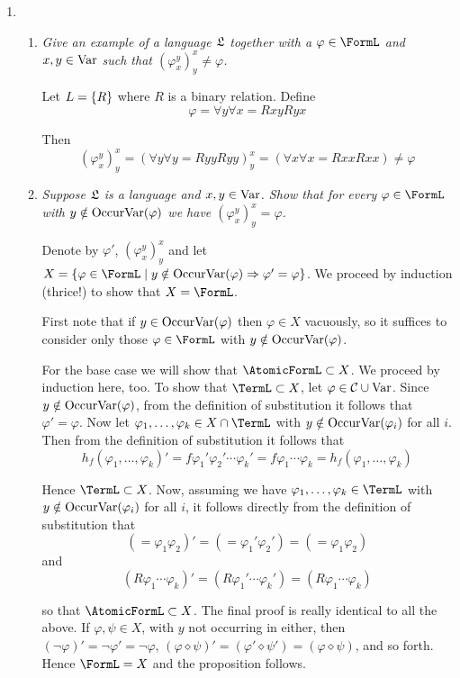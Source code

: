\documentclass[10pt]{article}
\begin{document}
\begin{enumerate}
\item
\begin{enumerate}
\item \emph{Give an example of a language $\mathfrak{L}$ together with a $\varphi \in \FormL$ and $x,y \in \operatorname{Var}$ such that $\left(\varphi_x^y\right)_y^x \neq \varphi$.}

Let $L = \left\{ R \right\}$ where $R$ is a binary relation.  Define
\[
\varphi = \forall y \forall x = Rxy Ryx
\]

Then
\[
(\varphi_x^y)_y^x = (\forall y \forall y = Ryy Ryy)_y^x = (\forall x \forall x = Rxx Rxx) \neq \varphi
\]

\item \emph{Suppose $\mathfrak{L}$ is a language and $x,y \in \operatorname{Var}$.  Show that for every $\varphi \in \FormL$ with $y \notin \operatorname{OccurVar}(\varphi)$ we have $(\varphi_x^y)_y^x = \varphi$.}

Denote by $\varphi'$, $(\varphi_x^y)_y^x$ and let $X = \set{\varphi \in \FormL \mid y \notin \OccurVar(\varphi) \Rightarrow \varphi' = \varphi}$.  We proceed by induction (thrice!) to show that $X = \FormL$.

First note that if $y \in \operatorname{OccurVar}(\varphi)$ then $\varphi \in X$ vacuously, so it suffices to consider only those $\varphi \in \FormL$ with $y \notin \operatorname{OccurVar}(\varphi)$.

For the base case we will show that $\AtomicFormL \subset X$.  We proceed by induction here, too.  To show that $\TermL \subset X$, let $\varphi \in \mathcal{C} \cup \operatorname{Var}$.  Since $y \notin \operatorname{OccurVar}(\varphi)$, from the definition of substitution it follows that $\varphi' = \varphi$.  Now let $\varphi_1, \ldots, \varphi_k \in X \cap \TermL$ with $y \notin \operatorname{OccurVar}(\varphi_i)$ for all $i$. Then from the definition of substitution it follows that
\[
h_f(\varphi_1, \ldots, \varphi_k)' = f\varphi_1' \varphi_2' \cdots \varphi_k' = f \varphi_1 \cdots \varphi_k = h_f(\varphi_1, \ldots, \varphi_k)
\]

Hence $\TermL \subset X$.  Now, assuming we have $\varphi_1, \ldots, \varphi_k \in \TermL$ with $y \notin \operatorname{OccurVar}(\varphi_i)$ for all $i$, it follows directly from the definition of substitution that
\[
(= \varphi_1 \varphi_2)' = (= \varphi_1' \varphi_2') = (= \varphi_1 \varphi_2)
\]
and
\[
(R\varphi_1 \cdots \varphi_k)' = (R\varphi_1' \cdots \varphi_k') = (R\varphi_1 \cdots \varphi_k)
\]

so that $\AtomicFormL \subset X$.  The final proof is really identical to all the above.  If $\varphi, \psi \in X$, with $y$ not occurring in either, then $(\neg \varphi)' = \neg \varphi' = \neg \varphi$, $(\varphi \diamond \psi)' = (\varphi' \diamond \psi') = (\varphi \diamond \psi)$, and so forth.  Hence $\FormL = X$ and the proposition follows.
\end{enumerate}


\end{enumerate}
\end{document}
